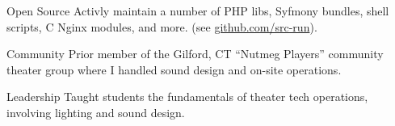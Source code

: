 


\begin{serviceSection}

    \serviceEntry
        {Open Source}
        {Activly maintain a number of PHP libs, Syfmony bundles, shell scripts, C Nginx modules, and more. (see \href{https://github.com/src-run}{github.com/src-run}).}

    \serviceEntry
        {Community}
        {Prior member of the Gilford, CT ``Nutmeg Players'' community theater group where I handled sound design and on-site operations.}

    \serviceEntry
        {Leadership}
        {Taught students the fundamentals of theater tech operations, involving lighting and sound design.}

\end{serviceSection}

